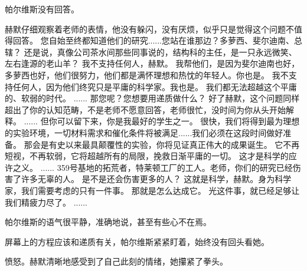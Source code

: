 \documentclass[openany]{book}
\begin{document}
\begin{dialogue}
    帕尔维斯没有回答。\par
    赫默仔细观察着老师的表情，他没有躲闪，没有厌烦，似乎只是觉得这个问题不值得回答。
     您自始至终都知道他们的研究......您站在谁那边？多萝西、斐尔迪南、总辖？
     还是说，真像公司茶水间那些同事说的，结构科的主任，是一只永远微笑、左右逢源的老山羊？
     我不支持任何人，赫默。
     我帮他们，是因为斐尔迪南也好，多萝西也好，他们很努力，他们都是满怀理想和热忱的年轻人。你也是。
     我不支持任何人，因为他们终究只是平庸的科学家。我也是。
     我们都无法超越这个平庸的、软弱的时代。
     ......
     那您呢？您想要用递质做什么？
     好了赫默，这个问题同样超出了你的认知范畴，不是老师不愿意回答，老师很忙，没时间为你从头开始解释。
     ......
     但你可以留下来，你是我最好的学生之一。
     很快，我们将得到最为理想的实验环境，一切材料需求和催化条件将被满足......我们必须在这段时间做好准备。
     那会是有史以来最具颠覆性的实验，你将见证真正伟大的成果诞生。
     它不再短视，不再软弱，它将超越所有的局限，挽救日渐平庸的一切。
     这才是科学的应许之义。
     ......
     359号基地的拓荒者，特莱顿工厂的工人。老师，你们的研究已经伤害了许多无辜的人。
     是不是还会伤害更多的人？
     这就是科学，赫默。身为科学家，我们需要考虑的只有一件事。
     那就是怎么达成它。
     光这件事，就已经足够让我们精疲力尽了。
     ......\par
    帕尔维斯的语气很平静，准确地说，甚至有些心不在焉。\par
    屏幕上的方程应该和递质有关，帕尔维斯紧紧盯着，始终没有回头看她。\par
    愤怒。赫默清晰地感受到了自己此刻的情绪，她攥紧了拳头。
\end{dialogue}
\end{document}
